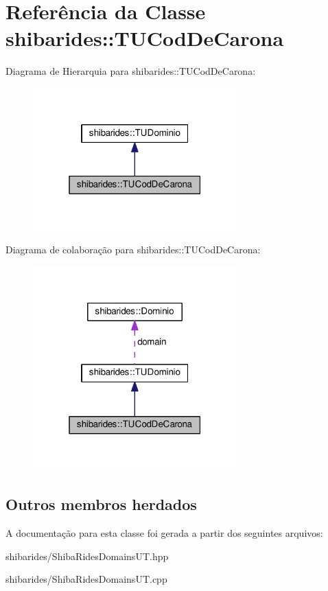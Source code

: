 \hypertarget{classshibarides_1_1TUCodDeCarona}{}\section{Referência da Classe shibarides\+:\+:T\+U\+Cod\+De\+Carona}
\label{classshibarides_1_1TUCodDeCarona}


Diagrama de Hierarquia para shibarides\+:\+:T\+U\+Cod\+De\+Carona\+:\nopagebreak
\begin{figure}[H]
\begin{center}
\leavevmode
\includegraphics[width=223pt]{classshibarides_1_1TUCodDeCarona__inherit__graph}
\end{center}
\end{figure}


Diagrama de colaboração para shibarides\+:\+:T\+U\+Cod\+De\+Carona\+:\nopagebreak
\begin{figure}[H]
\begin{center}
\leavevmode
\includegraphics[width=223pt]{classshibarides_1_1TUCodDeCarona__coll__graph}
\end{center}
\end{figure}
\subsection*{Outros membros herdados}


A documentação para esta classe foi gerada a partir dos seguintes arquivos\+:\begin{DoxyCompactItemize}
\item 
shibarides/Shiba\+Rides\+Domains\+U\+T.\+hpp\item 
shibarides/Shiba\+Rides\+Domains\+U\+T.\+cpp\end{DoxyCompactItemize}
